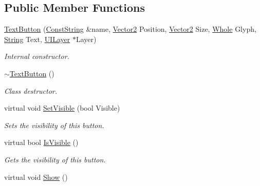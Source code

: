 \subsection*{Public Member Functions}
\begin{DoxyCompactItemize}
\item 
\hyperlink{classphys_1_1UI_1_1TextButton_a399ee921d2280771173e5e319c1d3f9e}{TextButton} (\hyperlink{namespacephys_a5ce5049f8b4bf88d6413c47b504ebb31}{ConstString} \&name, \hyperlink{classphys_1_1Vector2}{Vector2} Position, \hyperlink{classphys_1_1Vector2}{Vector2} Size, \hyperlink{namespacephys_a460f6bc24c8dd347b05e0366ae34f34a}{Whole} Glyph, \hyperlink{namespacephys_aa03900411993de7fbfec4789bc1d392e}{String} Text, \hyperlink{classphys_1_1UILayer}{UILayer} $\ast$Layer)
\begin{DoxyCompactList}\small\item\em Internal constructor. \item\end{DoxyCompactList}\item 
\hypertarget{classphys_1_1UI_1_1TextButton_a1f28489fee45ee8ce7e1b0aea0f249a1}{
\hyperlink{classphys_1_1UI_1_1TextButton_a1f28489fee45ee8ce7e1b0aea0f249a1}{$\sim$TextButton} ()}
\label{df/d03/classphys_1_1UI_1_1TextButton_a1f28489fee45ee8ce7e1b0aea0f249a1}

\begin{DoxyCompactList}\small\item\em Class destructor. \item\end{DoxyCompactList}\item 
virtual void \hyperlink{classphys_1_1UI_1_1TextButton_a07e030ef92f314b1eff663cbc1712d42}{SetVisible} (bool Visible)
\begin{DoxyCompactList}\small\item\em Sets the visibility of this button. \item\end{DoxyCompactList}\item 
virtual bool \hyperlink{classphys_1_1UI_1_1TextButton_a505167a00d343d704df1f759cd12ed1e}{IsVisible} ()
\begin{DoxyCompactList}\small\item\em Gets the visibility of this button. \item\end{DoxyCompactList}\item 
\hypertarget{classphys_1_1UI_1_1TextButton_add95c812af6ef7584a2d515a33bac72b}{
virtual void \hyperlink{classphys_1_1UI_1_1TextButton_add95c812af6ef7584a2d515a33bac72b}{Show} ()}
\label{df/d03/classphys_1_1UI_1_1TextButton_add95c812af6ef7584a2d515a33bac72b}


\end{DoxyCompactItemize}

